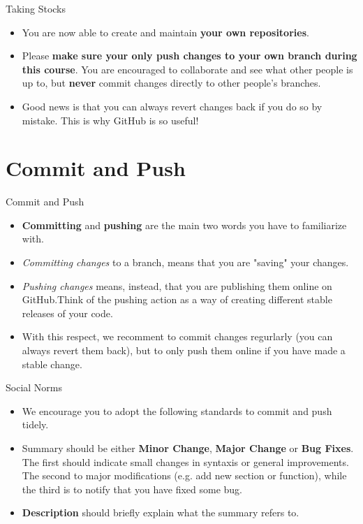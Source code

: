 \documentclass[aspectratio=169]{beamer}
\begin{document}
\begin{frame}{Taking Stocks}
\begin{itemize}\setlength\itemsep{2.5em}
	\item You are now able to create and maintain \textbf{your own repositories}.
	\item Please \textbf{make sure your only push changes to your own branch during this course}. You are encouraged to collaborate and see what other people is up to, but \textbf{never} commit changes directly to other people's branches.
	\item Good news is that you can always revert changes back if you do so by mistake. This is why GitHub is so useful!
\end{itemize}
\end{frame}

\section{Commit and Push}

\begin{frame}{Commit and Push}
	\begin{itemize}\setlength\itemsep{1.5em}
		\item \textbf{Committing} and \textbf{pushing} are the main two words you have to familiarize with.
		\item \emph{Committing changes} to a branch, means that you are "saving" your changes.
		\item \emph{Pushing changes} means, instead, that you are publishing them online on GitHub.Think of the pushing action as a way of creating different stable releases of your code.\item With this respect, we recomment to commit changes regurlarly (you can always revert them back), but to only push them online if you have made a stable change. 
	\end{itemize}
\end{frame}

\begin{frame}{Social Norms}
	\begin{itemize}\setlength\itemsep{2.5em}
		\item We encourage you to adopt the following standards to commit and push tidely.
		\item Summary should be either\textbf{ Minor Change}, \textbf{Major Change} or \textbf{Bug Fixes}. The first should indicate small changes in syntaxis or general improvements. The second to major modifications (e.g. add new section or function), while the third is to notify that you have fixed some bug.
		\item \textbf{Description} should briefly explain what the summary refers to.
	\end{itemize}
\end{frame}
\end{document}
